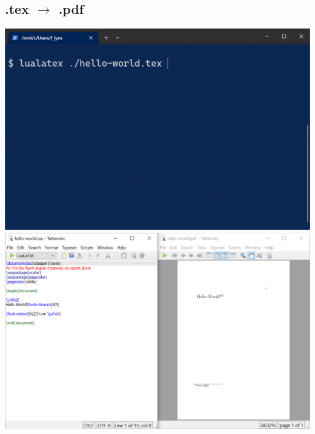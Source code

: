 \documentclass[
	layoutmode=block,
	blockwidth=96mm, blockheight=108mm,
	bleed=0mm,
	bindingoffset=0mm,
	imageblockwidth=0.98, imageblockheight=0.98,
	imageblockoffsettop=0mm,
	12pt,final,openany
]{photobook}
\begin{document}
\begin{spreadtopages}
	\vfill
	\begin{center}
		\section*{.tex $\longrightarrow$ .pdf}
		\vspace{1.5em}
		\hspace{1mm}
		\includegraphics[keepaspectratio, height=0.5\cellheight]{images/commandline}
		\hspace{4mm}
		\includegraphics[keepaspectratio, height=0.5\cellheight]{images/TeXWorks}
	\end{center}
	\vfill
\end{spreadtopages}


\end{document}
